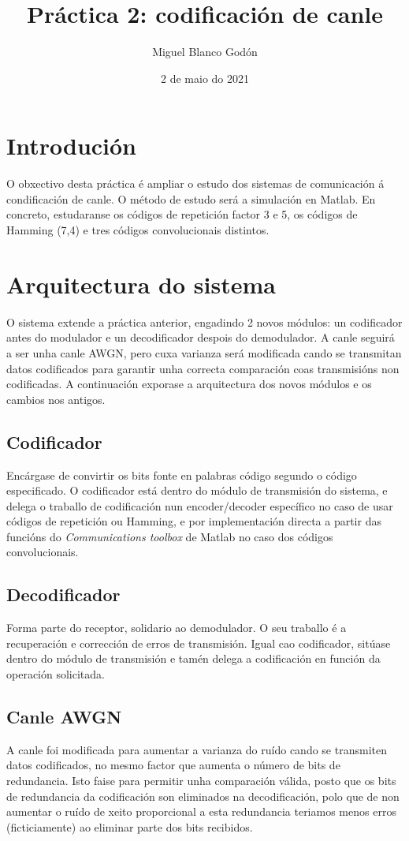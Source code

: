 \documentclass[
	10pt, %
	spanish, %
]{fphw}
\title{Práctica 2: codificación de canle}
\author{Miguel Blanco Godón}
\date{2 de maio do 2021}
\institute{Universidade da Coruña \\ Facultade de Informática}
\begin{document}
\maketitle 

\section*{Introdución}
O obxectivo desta práctica é ampliar o estudo dos sistemas de comunicación á condificación de canle. O método de estudo será a simulación en Matlab. En concreto, estudaranse os códigos de repetición factor 3 e 5, os códigos de Hamming (7,4) e tres códigos convolucionais distintos.
\section*{Arquitectura do sistema}
O sistema extende a práctica anterior, engadindo 2 novos módulos: un codificador antes do modulador e un decodificador despois do demodulador. A canle seguirá a ser unha canle AWGN, pero cuxa varianza será modificada cando se transmitan datos codificados para garantir unha correcta comparación coas transmisións non codificadas.
A continuación exporase a arquitectura dos novos módulos e os cambios nos antigos.
\subsection*{Codificador}
Encárgase de convirtir os bits fonte en palabras código segundo o código especificado. 
O codificador está dentro do módulo de transmisión do sistema, e delega o traballo de codificación nun encoder/decoder específico no caso de usar códigos de repetición ou Hamming, e por implementación directa a partir das funcións do \textit{Communications toolbox} de Matlab no caso dos códigos convolucionais.
\subsection*{Decodificador}
Forma parte do receptor, solidario ao demodulador. O seu traballo é a recuperación e corrección de erros de transmisión.
Igual cao codificador, sitúase dentro do módulo de transmisión e tamén delega a codificación en función da operación solicitada. 
\subsection*{Canle AWGN}
A canle foi modificada para aumentar a varianza do ruído cando se transmiten datos codificados, no mesmo factor que aumenta o número de bits de redundancia. Isto faise para permitir unha comparación válida, posto que os bits de redundancia da codificación son eliminados na decodificación, polo que de non aumentar o ruído de xeito proporcional a esta redundancia teriamos menos erros (ficticiamente) ao eliminar parte dos bits recibidos.
\end{document}
